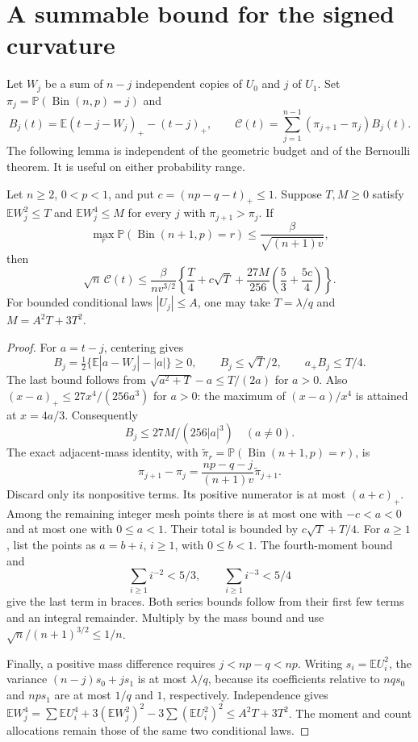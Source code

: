 \documentclass[11pt]{article}
\newcommand{\E}{\mathbb E}\newcommand{\Pp}{\mathbb P}
\begin{document}
\section{A summable bound for the signed curvature}
Let $W_j$ be a sum of $n-j$ independent copies of $U_0$ and $j$ of $U_1$.
Set $\pi_j=\Pp(\operatorname{Bin}(n,p)=j)$ and
\[
 B_j(t)=\E(t-j-W_j)_+-(t-j)_+,\qquad
 \mathcal C(t)=\sum_{j=1}^{n-1}(\pi_{j+1}-\pi_j)B_j(t).
\]
The following lemma is independent of the geometric budget and of the
Bernoulli theorem. It is useful on either probability range.

\begin{lemma}\label{g:curvature}
Let $n\ge2$, $0<p<1$, and put $c=(np-q-t)_+\le1$.
Suppose $T,M\ge0$ satisfy $\E W_j^2\le T$ and $\E W_j^4\le M$
for every $j$ with $\pi_{j+1}>\pi_j$. If
\[
 \max_r\Pp(\operatorname{Bin}(n+1,p)=r)
                  \le\frac{\beta}{\sqrt{(n+1)v}},
\]
then
\begin{equation}\label{g:curvbound}
 \sqrt n\,\mathcal C(t)\le\frac{\beta}{nv^{3/2}}
 \left\{\frac T4+c\sqrt T+
                 \frac{27M}{256}\left(\frac53+\frac{5c}4\right)\right\}.
\end{equation}
For bounded conditional laws $|U_j|\le A$, one may take
$T=\lambda/q$ and $M=A^2T+3T^2$.
\end{lemma}
\begin{proof}
For $a=t-j$, centering gives
\[
 B_j=\tfrac12\{\E|a-W_j|-|a|\}\ge0,
 \qquad B_j\le\sqrt T/2,\qquad a_+B_j\le T/4.
\]
The last bound follows from
$\sqrt{a^2+T}-a\le T/(2a)$ for $a>0$. Also
$(x-a)_+\le27x^4/(256a^3)$ for $a>0$: the maximum of
$(x-a)/x^4$ is attained at $x=4a/3$. Consequently
\[
                       B_j\le27M/(256|a|^3)\quad(a\ne0).
\]
The exact adjacent-mass identity, with
$\widetilde\pi_r=\Pp(\operatorname{Bin}(n+1,p)=r)$, is
\[
 \pi_{j+1}-\pi_j
    =\frac{np-q-j}{(n+1)v}\widetilde\pi_{j+1}.
\]
Discard only its nonpositive terms. Its positive numerator is at most
$(a+c)_+$. Among the remaining integer mesh points there is at most one
with $-c<a<0$ and at most one with $0\le a<1$. Their total is bounded
by $c\sqrt T+T/4$. For $a\ge1$, list the points as $a=b+i$, $i\ge1$,
with $0\le b<1$. The fourth-moment bound and
\[
 \sum_{i\ge1}i^{-2}<5/3,\qquad \sum_{i\ge1}i^{-3}<5/4
\]
give the last term in braces. Both series bounds follow from their first
few terms and an integral remainder. Multiply by the mass bound and use
$\sqrt n/(n+1)^{3/2}\le1/n$.

Finally, a positive mass difference requires $j<np-q<np$. Writing
$s_i=\E U_i^2$, the variance
$(n-j)s_0+js_1$ is at most $\lambda/q$, because its coefficients relative
to $nqs_0$ and $nps_1$ are at most $1/q$ and $1$, respectively.
Independence gives
$\E W_j^4=\sum\E U_i^4+3(\E W_j^2)^2-3\sum(\E U_i^2)^2
\le A^2T+3T^2$. The moment and count allocations remain those of the
same two conditional laws.
\end{proof}
\end{document}

